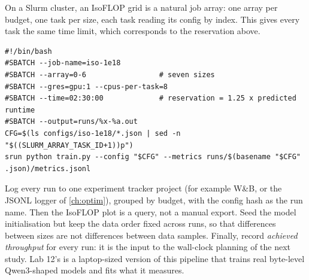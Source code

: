 On a Slurm cluster, an IsoFLOP grid is a natural job array: one array per budget, one task per
size, each task reading its config by index. This gives every task the same time limit, which
corresponds to the reservation above.

\begin{lstlisting}[style=shell, caption={One IsoFLOP budget as a Slurm job array (each task trains one size).},label={lst:scalinglaws:slurm}]
#!/bin/bash
#SBATCH --job-name=iso-1e18
#SBATCH --array=0-6                 # seven sizes
#SBATCH --gres=gpu:1 --cpus-per-task=8
#SBATCH --time=02:30:00             # reservation = 1.25 x predicted runtime
#SBATCH --output=runs/%x-%a.out
CFG=$(ls configs/iso-1e18/*.json | sed -n "$((SLURM_ARRAY_TASK_ID+1))p")
srun python train.py --config "$CFG" --metrics runs/$(basename "$CFG" .json)/metrics.jsonl
\end{lstlisting}

Log every run to one experiment tracker project (for example W\&B, or the JSONL logger of
\cref{ch:optim}), grouped by budget, with the config hash as the run name. Then the
IsoFLOP plot is a query, not a manual export. Seed the model initialisation but keep the data
order fixed across runs, so that differences between sizes are not differences between data
samples. Finally, record \emph{achieved throughput} for every run: it is the input to the
wall-clock planning of the next study. Lab 12's  is a laptop-sized version
of this pipeline that trains real byte-level Qwen3-shaped models and fits what it measures.

